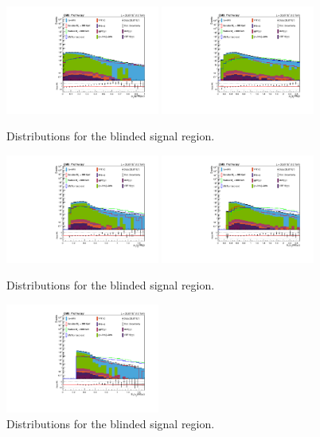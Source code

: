 \begin{figure}[thb]
  \centering
\includegraphics[width=0.45\textwidth]{figures/sec-control/LOG_jjptmjjgg.pdf}\hfil
\includegraphics[width=0.45\textwidth]{figures/sec-control/LOG_ljetptmgg}\hfil
  \caption{Distributions for the blinded signal region.}
\label{fig:cp_mgg5}
\end{figure}
\begin{figure}[thb]
  \centering
\includegraphics[width=0.45\textwidth]{figures/sec-control/LOG_sjetptmgg}\hfil
\includegraphics[width=0.45\textwidth]{figures/sec-control/LOG_lphoptmgg}\hfil
  \caption{Distributions for the blinded signal region.}
\label{fig:cp_mgg6}
\end{figure}
\begin{figure}[thb]
  \centering
\includegraphics[width=0.45\textwidth]{figures/sec-control/LOG_sphoptmgg}\hfil
  \caption{Distributions for the blinded signal region.}
\label{fig:cp_mgg7}
\end{figure}

